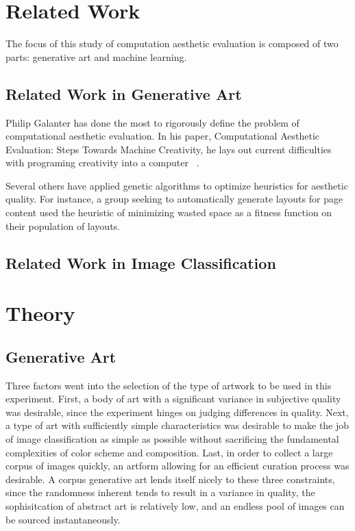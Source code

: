 \documentclass[midd]{thesis}
\begin{document}

\chapter{Related Work}

The focus of this study of computation aesthetic evaluation is composed of two parts: generative art and machine learning.

\section{Related Work in Generative Art}

Philip Galanter has done the most to rigorously define the problem of computational aesthetic evaluation. In his paper, Computational Aesthetic Evaluation: Steps Towards Machine Creativity, he lays out current difficulties with programing creativity into a computer ~\cite{galanter-3}.

Several others have applied genetic algorithms to optimize heuristics for aesthetic quality. For instance, a group
seeking to automatically generate layouts for page content used the heuristic of minimizing wasted space as a fitness
function on their population of layouts.

\section{Related Work in Image Classification}

\chapter{Theory}

\section{Generative Art}

Three factors went into the selection of the type of artwork to be used in this experiment. First, a body of art with a significant variance in subjective quality was desirable, since the experiment hinges on judging differences in quality. Next, a type of art with sufficiently simple characteristics was desirable to make the job of image classification as simple as possible without sacrificing the fundamental complexities of color scheme and composition. Last, in order to collect a large corpus of images quickly, an artform allowing for an efficient curation process was desirable. A corpus generative art lends itself nicely to these three constraints, since the randomness inherent tends to result in a variance in quality, the sophisitcation of abstract art is relatively low, and an endless pool of images can be sourced instantaneously.
\end{document}
